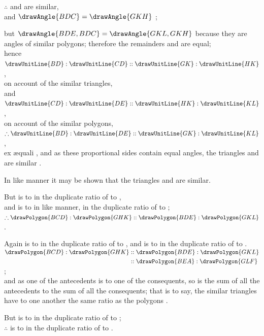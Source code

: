 \documentclass[booklanguage=english]{byrnebook}
\begin{document}
\begin{center}
$\therefore$  and  are similar,\\
and $\drawAngle{BDC} = \drawAngle{GKH}$ ;

but $\drawAngle{BDE,BDC} = \drawAngle{GKL,GKH}$ because they are angles of similar polygons; therefore the remainders  and  are equal;\\
hence $\drawUnitLine{BD} : \drawUnitLine{CD} :: \drawUnitLine{GK} : \drawUnitLine{HK}$,\\
on account of the similar triangles,\\
and $\drawUnitLine{CD} : \drawUnitLine{DE} :: \drawUnitLine{HK} : \drawUnitLine{KL}$,\\
on account of the similar polygons,\\
$\therefore \drawUnitLine{BD} : \drawUnitLine{DE} :: \drawUnitLine{GK} : \drawUnitLine{KL}$,\\
ex \ae quali , and as these proportional sides contain equal angles, the triangles  and  are similar .

In like manner it may be shown that the triangles  and  are similar.

But  is to  in the duplicate ratio of  to  ,\\
and  is to  in like manner, in the duplicate ratio of  to ;\\
$\therefore \drawPolygon{BCD} : \drawPolygon{GHK} :: \drawPolygon{BDE} : \drawPolygon{GKL}$ .

Again  is to  in the duplicate ratio of  to , and  is to  in the duplicate ratio of  to .\\
$\begin{aligned}
\drawPolygon{BCD} : \drawPolygon{GHK} &:: \drawPolygon{BDE} : \drawPolygon{GKL} \\
&:: \drawPolygon{BEA} : \drawPolygon{GLF} \\
\end{aligned}$;\\
and as one of the antecedents is to one of the consequents, so is the sum of all the antecedents to the sum of all the consequents; that is to say, the similar triangles have to one another the same ratio as the polygons .

But  is to  in the duplicate ratio of  to ;\\
$\therefore$  is to  in the duplicate ratio of  to .
\end{center}
\end{document}
